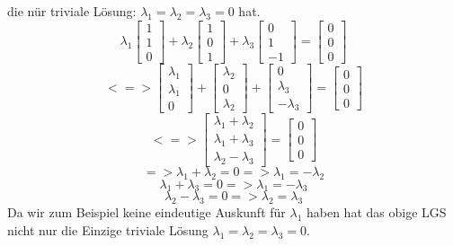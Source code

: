 \documentclass[11pt]{article}
\begin{document}
				die nür triviale Lösung: $\lambda_1=\lambda_2=\lambda_3=0$ hat.\\
				$$\lambda_1 \begin{bmatrix}1\\1\\0\end{bmatrix} +
				\lambda_2 \begin{bmatrix}1\\0\\1\end{bmatrix} +
				\lambda_3 \begin{bmatrix}0\\1\\-1\end{bmatrix} = \begin{bmatrix}0\\0\\0\end{bmatrix}$$
				$$<=> \begin{bmatrix}\lambda_1\\\lambda_1\\0\end{bmatrix} +
				\begin{bmatrix}\lambda_2\\0\\\lambda_2\end{bmatrix} +
				\begin{bmatrix}0\\\lambda_3 \\-\lambda_3 \end{bmatrix} = \begin{bmatrix}0\\0\\0\end{bmatrix}$$
				$$<=>\begin{bmatrix}\lambda_1+\lambda_2\\\lambda_1+\lambda_3\\\lambda_2-\lambda_3\end{bmatrix}=\begin{bmatrix}0\\0\\0\end{bmatrix}$$
				$$=>\lambda_1+\lambda_2=0=>\lambda_1=-\lambda_2$$
				$$\lambda_1+\lambda_3=0=>\lambda_1=-\lambda_3$$
				$$\lambda_2-\lambda_3=0=>\lambda_2=\lambda_3$$
				Da wir zum Beispiel keine eindeutige Auskunft für $\lambda_1$ haben hat das obige LGS nicht nur die Einzige triviale Lösung $\lambda_1=\lambda_2=\lambda_3=0$.\\
\end{document}

